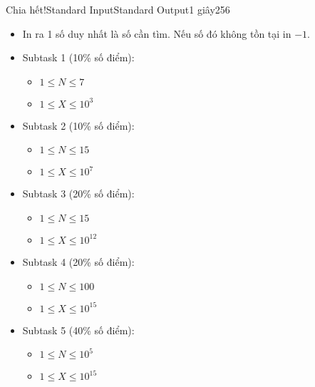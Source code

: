 \documentclass[11pt,a4paper,oneside]{article}
\begin{document}
\begin{problem}{Chia hết!}{Standard Input}{Standard Output}{1 giây}{256}
\OutputFile

\begin{itemize}
	\item In ra 1 số duy nhất là số cần tìm. Nếu số đó không tồn tại in $-1$.
\end{itemize}

\Constraints
\begin{itemize}
	\item Subtask 1 (10\% số điểm):
	\begin{itemize}
		\item $1 \le N \le 7$
		\item $1 \le X \le 10^3$
	\end{itemize}
	\item Subtask 2 (10\% số điểm):
	\begin{itemize}
		\item $1 \le N \le 15$
		\item $1 \le X \le 10^7$
	\end{itemize}
	\item Subtask 3 (20\% số điểm):
	\begin{itemize}
		\item $1 \le N \le 15$
		\item $1 \le X \le 10^{12}$
	\end{itemize}
	\item Subtask 4 (20\% số điểm):
	\begin{itemize}
		\item $1 \le N \le 100$
		\item $1 \le X \le 10^{15}$
	\end{itemize}
	\item Subtask 5 (40\% số điểm):
	\begin{itemize}
		\item $1 \le N \le 10^5$
		\item $1 \le X \le 10^{15}$
	\end{itemize}
\end{itemize}

\Example

\begin{example}
%
\end{example}

\vspace{.5cm}

\end{problem}
\end{document}
